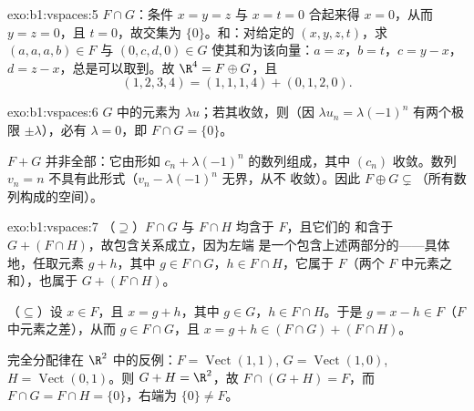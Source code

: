 \begin{solution}{exo:b1:vspaces:5}
$F \cap G$：条件 $x = y = z$ 与 $x = t = 0$ 合起来得
$x = 0$，从而 $y = z = 0$，且 $t = 0$，故交集为
$\{0\}$。和：对给定的 $(x,y,z,t)$，求 $(a,a,a,b) \in F$ 与
$(0,c,d,0) \in G$ 使其和为该向量：$a = x$，$b = t$，$c = y - x$，$d =
z - x$，总是可以取到。故 $\R^4 = F \oplus G$，且
\[
(1,2,3,4) = (1,1,1,4) + (0,1,2,0) .
\]
\end{solution}

\begin{solution}{exo:b1:vspaces:6}
$G$ 中的元素为 $\lambda u$；若其收敛，则（因
$\lambda u_n = \lambda(-1)^n$ 有两个极限 $\pm
\lambda$），必有 $\lambda = 0$，即 $F \cap G = \{0\}$。

$F + G$ 并非全部：它由形如
$c_n + \lambda(-1)^n$ 的数列组成，其中 $(c_n)$ 收敛。数列 $v_n =
n$ 不具有此形式（$v_n - \lambda(-1)^n$ 无界，从不
收敛）。因此 $F \oplus G \subsetneq$（所有数列构成的空间）。
\end{solution}

\begin{solution}{exo:b1:vspaces:7}
（$\supseteq$）$F \cap G$ 与 $F \cap H$ 均含于 $F$，且它们的
和含于 $G + (F \cap H)$，故包含关系成立，因为左端
是一个包含上述两部分的——具体地，任取元素 $g +
h$，其中 $g \in F\cap G$，$h \in F \cap H$，它属于 $F$（两个
$F$ 中元素之和），也属于 $G + (F \cap H)$。

（$\subseteq$）设 $x \in F$，且 $x = g + h$，其中 $g \in G$，$h \in F
\cap H$。于是 $g = x - h \in F$（$F$ 中元素之差），从而
$g \in F \cap G$，且 $x = g + h \in (F \cap G) + (F \cap H)$。

完全分配律在 $\R^2$ 中的反例：$F =
\operatorname{Vect}(1,1)$, $G = \operatorname{Vect}(1,0)$, $H =
\operatorname{Vect}(0,1)$。则 $G + H = \R^2$，故 $F \cap (G+H) =
F$，而 $F \cap G = F \cap H = \{0\}$，右端为 $\{0\}
\neq F$。
\end{solution}

